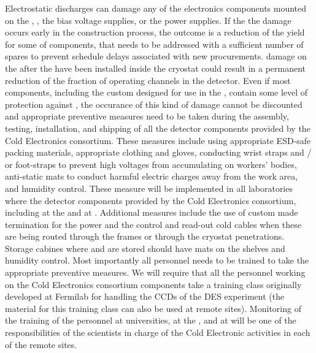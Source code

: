 Electrostatic discharges can damage any of the electronics
components mounted on the , ,
the bias voltage supplies, or the power supplies. If the
the damage occurs early in the construction process, 
the outcome is a reduction
of the yield for some of components, that needs to be
addressed with a sufficient number of spares to prevent
schedule delays associated with new procurements. 
damage on the  after the  have been
installed inside the cryostat could result in a permanent
reduction of the fraction of operating channels in the
detector. Even if most components, including the custom 
 designed for use in the , contain 
some level of protection  against , the occurance 
of this kind of damage cannot be discounted and appropriate 
preventive measures need to be taken during the 
assembly, testing, installation, and shipping of all the detector 
components provided by the Cold Electronics consortium. These 
measures include using appropriate ESD-safe packing materials, 
appropriate clothing and gloves, conducting wrist straps 
and / or foot-straps to prevent high voltages from accumulating 
on workers' bodies, anti-static mats to conduct harmful electric 
charges away from the work area, and humidity control. These
measure will be implemented in all laboratories where the
detector components provided by the Cold Electronics consortium,
including at the  and at \surf. Additional measures
include the use of custom made termination for the
power and the control and read-out cold cables when these
are being routed through the  frames or through the
cryostat penetrations. Storage cabines where  and
 are stored should have  mats
on the shelves and humidity control. Most importantly all personnel needs 
to be trained to take the appropriate preventive measures. We 
will require that all the personnel working on the Cold Electronics 
consortium components take a training class originally developed 
at Fermilab for handling the CCDs of the DES experiment (the 
material for this training class can also be used at remote 
sites). Monitoring of the training of the personnel at universities, 
at the , and at \surf will be one of the responsibilities 
of the scientists in charge of the Cold Electronic activities in
each of the remote sites.


